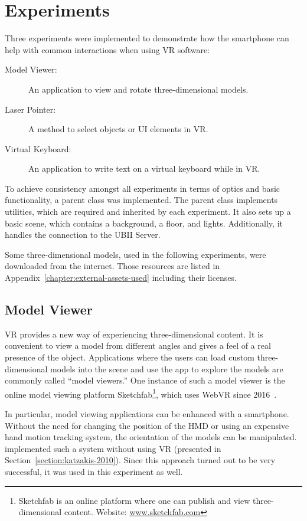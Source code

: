 \chapter{Experiments}\label{chapter:experiments}

Three experiments were implemented to demonstrate how the smartphone can help with common interactions when using \gls{VR} software:

\begin{description}
  \item[Model Viewer:] An application to view and rotate three-dimensional models.
  \item[Laser Pointer:] A method to select objects or \gls{UI} elements in \gls{VR}.
  \item[Virtual Keyboard:] An application to write text on a virtual keyboard while in \gls{VR}.
\end{description}

To achieve consistency amongst all experiments in terms of optics and basic functionality, a parent class was implemented. The parent class implements utilities, which are required and inherited by each experiment. It also sets up a basic scene, which contains a background, a floor, and lights. Additionally, it handles the connection to the \gls{UBII} Server.

Some three-dimensional models, used in the following experiments, were downloaded from the internet. Those resources are listed in Appendix~\ref{chapter:external-assets-used} including their licenses.


\section{Model Viewer}\label{section:model-viewer}

\acrlong{VR} provides a new way of experiencing three-dimensional content. It is convenient to view a model from different angles and gives a feel of a real presence of the object. Applications where the users can load custom three-dimensional models into the scene and use the app to explore the models are commonly called \enquote{model viewers.} One instance of such a model viewer is the online model viewing platform Sketchfab\footnote{Sketchfab is an online platform where one can publish and view three-dimensional content. Website: \href{https://sketchfab.com}{www.sketchfab.com}}, which uses Web\gls{VR} since 2016~\cite{Denoyel.2016}. 

In particular, model viewing applications can be enhanced with a smartphone. Without the need for changing the position of the \gls{HMD} or using an expensive hand motion tracking system, the orientation of the models can be manipulated.
\citeauthor{Katzakis.2010} implemented such a system without using \gls{VR} (presented in Section~\ref{section:katzakis-2010}). Since this approach turned out to be very successful, it was used in this experiment as well.

